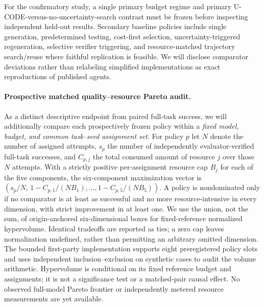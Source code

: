 \documentclass[pdflatex,sn-basic]{sn-jnl}
\begin{document}
For the confirmatory study, a single primary budget regime and
primary U-CODE-versus-no-uncertainty-search contrast must be frozen
before inspecting independent held-out results. Secondary baseline
policies include single generation, predetermined testing,
cost-first selection, uncertainty-triggered regeneration,
selective verifier triggering, and resource-matched trajectory
search/reuse where faithful replication is feasible. We will
disclose comparator deviations rather than relabeling simplified
implementations as exact reproductions of published agents.

\paragraph{Prospective matched quality--resource Pareto audit.}
As a distinct descriptive endpoint from paired full-task
success, we will additionally compare each prospectively
frozen policy within a \emph{fixed model, budget, and common
task--seed assignment set}. For policy $p$ let $N$ denote
the number of assigned attempts, $s_p$ the number of
independently evaluator-verified full-task successes,
and $C_{p,j}$ the total consumed amount of resource
$j$ over those $N$ attempts. With a strictly positive
per-assignment resource cap $B_j$ for each of the five
components, the six-component maximization vector
is $(s_p/N,\,1-C_{p,1}/(NB_1),\ldots,
1-C_{p,5}/(NB_5))$. A policy is nondominated only if
no comparator is at least as successful and no more
resource-intensive in every dimension, with strict
improvement in at least one. We use the union, not the
sum, of origin-anchored six-dimensional boxes for
fixed-reference normalized hypervolume. Identical
tradeoffs are reported as ties; a zero cap leaves
normalization undefined, rather than permitting an
arbitrary omitted dimension. The bounded first-party
implementation supports eight preregistered policy
slots and uses independent inclusion--exclusion
on synthetic cases to audit the volume arithmetic.
Hypervolume is conditional on its fixed reference
budget and assignments; it is not a significance
test or a matched-pair causal effect. No observed
full-model Pareto frontier or independently metered
resource measurements are yet available.
\end{document}
